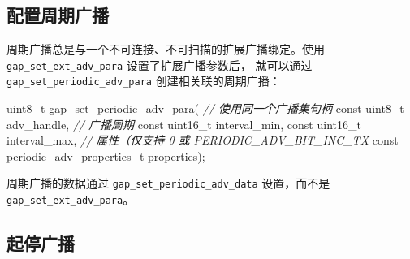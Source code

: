 \documentclass[
  12pt,
]{book}
\newenvironment{Shaded}{\begin{snugshade}}{\end{snugshade}}
\newcommand{\CommentTok}[1]{\textcolor[rgb]{0.56,0.35,0.01}{\textit{#1}}}
\newcommand{\DataTypeTok}[1]{\textcolor[rgb]{0.13,0.29,0.53}{#1}}
\newcommand{\DecValTok}[1]{\textcolor[rgb]{0.00,0.00,0.81}{#1}}
\newcommand{\KeywordTok}[1]{\textcolor[rgb]{0.13,0.29,0.53}{\textbf{#1}}}
\newcommand{\NormalTok}[1]{#1}
\newcommand{\StringTok}[1]{\textcolor[rgb]{0.31,0.60,0.02}{#1}}
\begin{document}
\begin{enumerate}
\begin{Shaded}
\end{Shaded}
\end{enumerate}

\hypertarget{ux914dux7f6eux5468ux671fux5e7fux64ad}{%
\subsection{配置周期广播}\label{ux914dux7f6eux5468ux671fux5e7fux64ad}}

周期广播总是与一个不可连接、不可扫描的扩展广播绑定。使用 \texttt{gap\_set\_ext\_adv\_para} 设置了扩展广播参数后，
就可以通过 \texttt{gap\_set\_periodic\_adv\_para} 创建相关联的周期广播：

\begin{Shaded}
\begin{Highlighting}[]
\DataTypeTok{uint8_t}\NormalTok{ gap_set_periodic_adv_para(}
  \CommentTok{// 使用同一个广播集句柄}
  \DataTypeTok{const} \DataTypeTok{uint8_t}\NormalTok{ adv_handle,}
  \CommentTok{// 广播周期}
  \DataTypeTok{const} \DataTypeTok{uint16_t}\NormalTok{ interval_min,}
  \DataTypeTok{const} \DataTypeTok{uint16_t}\NormalTok{ interval_max,}
  \CommentTok{// 属性（仅支持 0 或 PERIODIC_ADV_BIT_INC_TX}
  \DataTypeTok{const}\NormalTok{ periodic_adv_properties_t properties);}
\end{Highlighting}
\end{Shaded}

周期广播的数据通过 \texttt{gap\_set\_periodic\_adv\_data} 设置，而不是 \texttt{gap\_set\_ext\_adv\_para}。

\hypertarget{ux8d77ux505cux5e7fux64ad}{%
\subsection{起停广播}\label{ux8d77ux505cux5e7fux64ad}}
\end{document}
